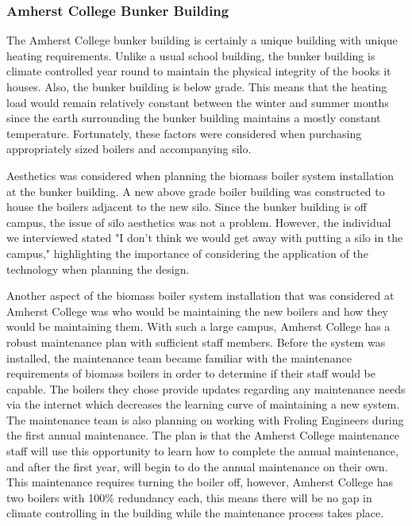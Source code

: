\subsubsection{Amherst College Bunker Building}
\par The Amherst College bunker building is certainly a unique building with unique heating requirements. Unlike a usual school building, the bunker building is climate controlled year round to maintain the physical integrity of the books it houses. Also, the bunker building is below grade. This means that the heating load would remain relatively constant between the winter and summer months since the earth surrounding the bunker building maintains a mostly constant temperature. Fortunately, these factors were considered when purchasing appropriately sized boilers and accompanying silo.
\par Aesthetics was considered when planning the biomass boiler system installation at the bunker building. A new above grade boiler building was constructed to house the boilers adjacent to the new silo. Since the bunker building is off campus, the issue of silo aesthetics was not a problem. However, the individual we interviewed stated "I don't think we would get away with putting a silo in the campus," highlighting the importance of considering the application of the technology when planning the design.
\par Another aspect of the biomass boiler system installation that was considered at Amherst College was who would be maintaining the new boilers and how they would be maintaining them. With such a large campus, Amherst College has a robust maintenance plan with sufficient staff members. Before the system was installed, the maintenance team became familiar with the maintenance requirements of biomass boilers in order to determine if their staff would be capable. The boilers they chose provide updates regarding any maintenance needs via the internet which decreases the learning curve of maintaining a new system. The maintenance team is also planning on working with Froling Engineers during the first annual maintenance. The plan is that the Amherst College maintenance staff will use this opportunity to learn how to complete the annual maintenance, and after the first year, will begin to do the annual maintenance on their own. This maintenance requires turning the boiler off, however, Amherst College has two boilers with 100\% redundancy each, this means there will be no gap in climate controlling in the building while the maintenance process takes place.

